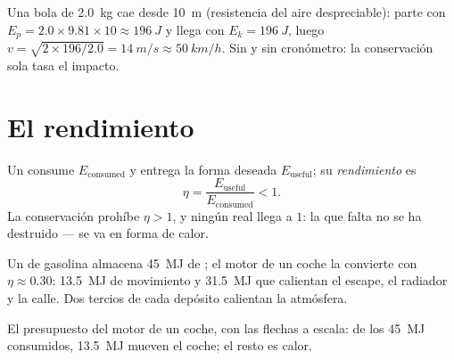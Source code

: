 \begin{example}\label{ex:g10:energy-conservation:fall}
Una bola de \qty{2.0}{kg} cae desde \qty{10}{m} (resistencia del aire
despreciable): parte con
$E_p = 2.0 \times 9.81 \times 10 \approx \qty{196}{J}$ y llega con
$E_k = \qty{196}{J}$, luego
$v = \sqrt{2 \times 196/2.0} = \qty{14}{m/s} \approx \qty{50}{km/h}$.
Sin  y sin cronómetro: la conservación sola tasa el impacto.
\end{example}

\section{El rendimiento}

\begin{definition}[Rendimiento]\label{def:g10:energy-conservation:efficiency}
Un  consume $E_{\text{consumed}}$ y entrega la forma deseada
$E_{\text{useful}}$; su \emph{rendimiento} es
\[
\eta = \frac{E_{\text{useful}}}{E_{\text{consumed}}} < 1 .
\]
La conservación prohíbe $\eta > 1$, y ningún  real llega a
$1$: la  que falta no se ha destruido --- se va en forma de
calor.
\end{definition}

\begin{example}\label{ex:g10:energy-conservation:engine}
Un  de gasolina almacena \qty{45}{MJ} de ; el
motor de un coche la convierte con $\eta \approx 0.30$: \qty{13.5}{MJ}
de movimiento y \qty{31.5}{MJ} que calientan el escape, el radiador y la
calle. Dos tercios de cada depósito calientan la atmósfera.
\end{example}

\begin{omfigure}

{\small El presupuesto del motor de un coche, con las flechas a escala:
de los \qty{45}{MJ} consumidos, \qty{13.5}{MJ} mueven el coche; el resto
es calor.}
\end{omfigure}

